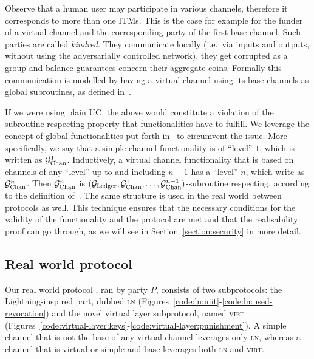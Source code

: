   Observe that a human user may participate in various channels, therefore it
  corresponds to more than one ITMs. This is the case for example for the funder
  of a virtual channel and the corresponding party of the first base channel.
  Such parties are called \emph{kindred}. They communicate locally (i.e.\ via
  inputs and outputs, without using the adversarially controlled network), they
  get corrupted as a group and balance guarantees concern their aggregate coins.
  Formally this communication is modelled by having a virtual channel using its
  base channels as global subroutines, as defined
  in~\cite{DBLP:conf/tcc/BadertscherCHTZ20}.

  If we were using plain UC, the above would constitute a violation of the
  subroutine respecting property that functionalities have to fulfill. We
  leverage the concept of global functionalities put forth
  in~\cite{DBLP:conf/tcc/BadertscherCHTZ20} to circumvent the issue. More
  specifically, we say that a simple channel functionality is of ``level'' $1$,
  which is written as $\mathcal{G}_{\mathrm{Chan}}^{1}$. Inductively, a virtual channel
  functionality that is based on channels of any ``level'' up to and including
  $n-1$ has a ``level'' $n$, which write as $\mathcal{G}_{\mathrm{Chan}}^{n}$. Then $\mathcal{G}_{\mathrm{Chan}}^{n}$
  is $(\mathcal{G}_{\mathrm{Ledger}}, \mathcal{G}_{\mathrm{Chan}}^{1}, \dots, \mathcal{G}_{\mathrm{Chan}}^{n-1})$-subroutine respecting,
  according to the definition of~\cite{DBLP:conf/tcc/BadertscherCHTZ20}. The
  same structure is used in the real world between protocols as well. This
  technique ensures that the necessary conditions for the validity of the
  functionality and the protocol are met and that the realisability proof can go
  through, as we will see in Section~\ref{section:security} in more detail.

  \subsection{Real world protocol \pchan}
  Our real world protocol \pchan, ran by party $P$, consists of two
  subprotocols: the Lightning-inspired part, dubbed \textsc{ln}
  (Figures~\ref{code:ln:init}-\ref{code:ln:used-revocation}) and the novel
  virtual layer subprotocol, named \textsc{virt}
  (Figures~\ref{code:virtual-layer:keys}-\ref{code:virtual-layer:punishment}). A
  simple channel that is not the base of any virtual channel leverages only
  \textsc{ln}, whereas a channel that is virtual or simple and base leverages
  both \textsc{ln} and \textsc{virt}.

